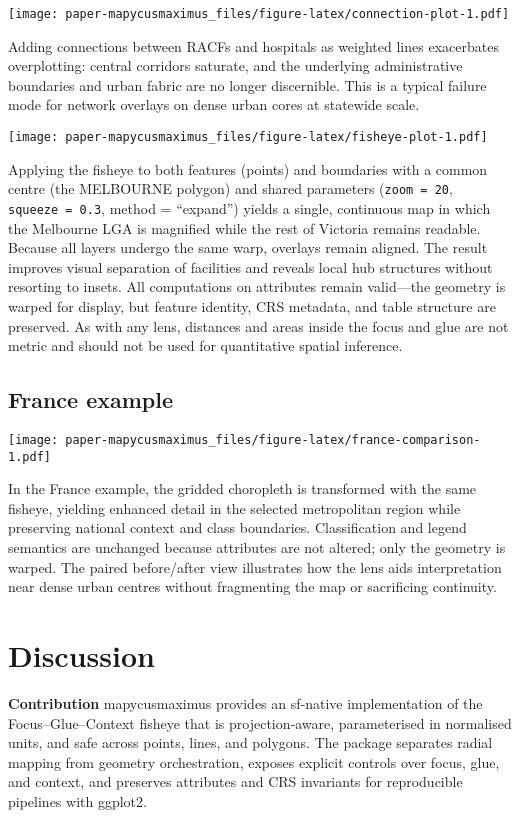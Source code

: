 \texttt{[image: paper-mapycusmaximus\_files/figure-latex/connection-plot-1.pdf]}

Adding connections between RACFs and hospitals as weighted lines exacerbates overplotting: central corridors saturate, and the underlying administrative boundaries and urban fabric are no longer discernible. This is a typical failure mode for network overlays on dense urban cores at statewide scale.

\texttt{[image: paper-mapycusmaximus\_files/figure-latex/fisheye-plot-1.pdf]}

Applying the fisheye to both features (points) and boundaries with a common centre (the MELBOURNE polygon) and shared parameters (\texttt{zoom\ =\ 20}, \texttt{squeeze\ =\ 0.3}, method = ``expand'') yields a single, continuous map in which the Melbourne LGA is magnified while the rest of Victoria remains readable. Because all layers undergo the same warp, overlays remain aligned. The result improves visual separation of facilities and reveals local hub structures without resorting to insets. All computations on attributes remain valid---the geometry is warped for display, but feature identity, CRS metadata, and table structure are preserved. As with any lens, distances and areas inside the focus and glue are not metric and should not be used for quantitative spatial inference.

\hypertarget{france-example}{%
\subsection{France example}\label{france-example}}

\texttt{[image: paper-mapycusmaximus\_files/figure-latex/france-comparison-1.pdf]}

In the France example, the gridded choropleth is transformed with the same fisheye, yielding enhanced detail in the selected metropolitan region while preserving national context and class boundaries. Classification and legend semantics are unchanged because attributes are not altered; only the geometry is warped. The paired before/after view illustrates how the lens aids interpretation near dense urban centres without fragmenting the map or sacrificing continuity.

\hypertarget{discussion}{%
\section{Discussion}\label{discussion}}

\textbf{Contribution} mapycusmaximus provides an sf‑native implementation of the Focus--Glue--Context fisheye that is projection‑aware, parameterised in normalised units, and safe across points, lines, and polygons. The package separates radial mapping from geometry orchestration, exposes explicit controls over focus, glue, and context, and preserves attributes and CRS invariants for reproducible pipelines with ggplot2.

